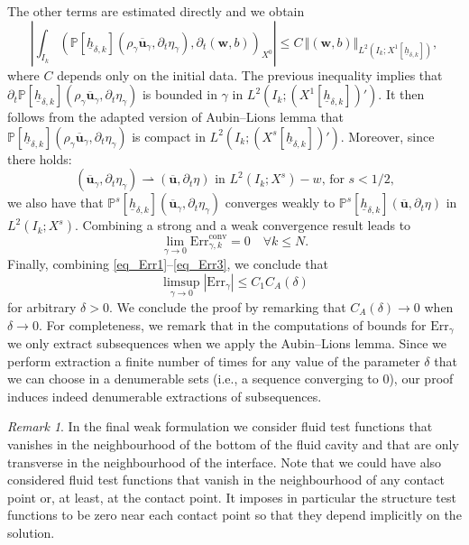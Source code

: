 \documentclass[11pt]{article}
\newcommand{\ie}{i.e.,\xspace}
\newcommand{\conv}{\mathrm{conv}}
\newcommand{\Err}{\mathrm{Err}}
\theoremstyle{remark}
\newtheorem{remark}[theorem]{Remark}
\theoremstyle{definition}
\newcommand{\norme}[1]{\,\Vert #1\Vert}
\newcommand{\ug}{\boldsymbol{u}}
\newcommand{\wg}{\boldsymbol{w}}
\newcommand{\hb}{{\underline{h}}}
\begin{document}
The other terms are estimated directly and we obtain
\[
\left\vert \int_{I_{k}}\left( \mathbb{P}[\hb_{\delta, k}](\rho_{\gamma}\overline{\ug}_{\gamma},\partial_{t}\eta_{\gamma}), \partial_{t}(\wg,b) \right)_{X^0}\right\vert \leq C\norme{(\wg,b)}_{L^{2}(I_{k};X^{1}[\hb_{\delta, k}])},
\]
where $C$ depends only on the initial data.
The previous inequality implies that $\partial_{t}\mathbb{P}[\hb_{\delta, k}](\rho_{\gamma}\overline{\ug}_{\gamma},\partial_{t}\eta_{\gamma})$ is bounded in $\gamma$ in $L^{2}(I_{k};(X^{1}[\hb_{\delta, k}])')$. It then follows from the adapted version of Aubin--Lions lemma that $\mathbb{P}[\hb_{\delta, k}](\rho_{\gamma}\overline{\ug}_{\gamma},\partial_{t}\eta_{\gamma})$ is compact in $L^{2}(I_{k};(X^{s}[\hb_{\delta, k}])')$. Moreover, since there holds:
\[
(\overline{\ug}_{\gamma},\partial_t \eta_{\gamma}) \rightharpoonup (\overline{\ug},\partial_t \eta) \text{ in $L^2(I_k; X^s)-w$, for $s<1/2$,}
\]
we also have that
$\mathbb P^s[\hb_{\delta,k}](\overline{\ug}_{\gamma},\partial_t \eta_{\gamma})$ converges weakly to $\mathbb P^s[\hb_{\delta,k}](\overline{\ug},\partial_t \eta)$ in $L^2(I_k;X^s)$. Combining a strong and a weak convergence result leads to
\begin{equation} \label{eq_Err3}
\lim_{\gamma \to 0} \Err_{\gamma,k}^{\conv} = 0 \quad \forall k \leq N.
\end{equation}
Finally, combining \eqref{eq_Err1}--\eqref{eq_Err3}, we conclude that
\[
\limsup_{\gamma \to 0} |\Err_{\gamma} | \leq C_1C_A(\delta)
\]
for arbitrary $\delta >0$. We conclude the proof by remarking that $C_A(\delta) \to 0$ when $\delta \to 0$. For completeness, we remark that in the computations of bounds for $\Err_{\gamma}$ we only extract subsequences when we apply the Aubin--Lions lemma. Since we perform extraction a finite number of times for any value of the parameter $\delta$ that we can choose in a denumerable sets (\ie a sequence converging to $0$), our proof induces indeed denumerable extractions of subsequences.

\begin{remark} \label{rem:testfunction}
In the final weak formulation we consider fluid test functions that vanishes in the neighbourhood of the bottom of the fluid cavity and that are only transverse in the neighbourhood of the interface. Note that we could have also considered fluid test functions that vanish in the neighbourhood of any contact point or, at least, at the contact point. It imposes in particular the structure test functions to be zero near each contact point so that they depend implicitly on the solution.
\end{remark}
\end{document}
